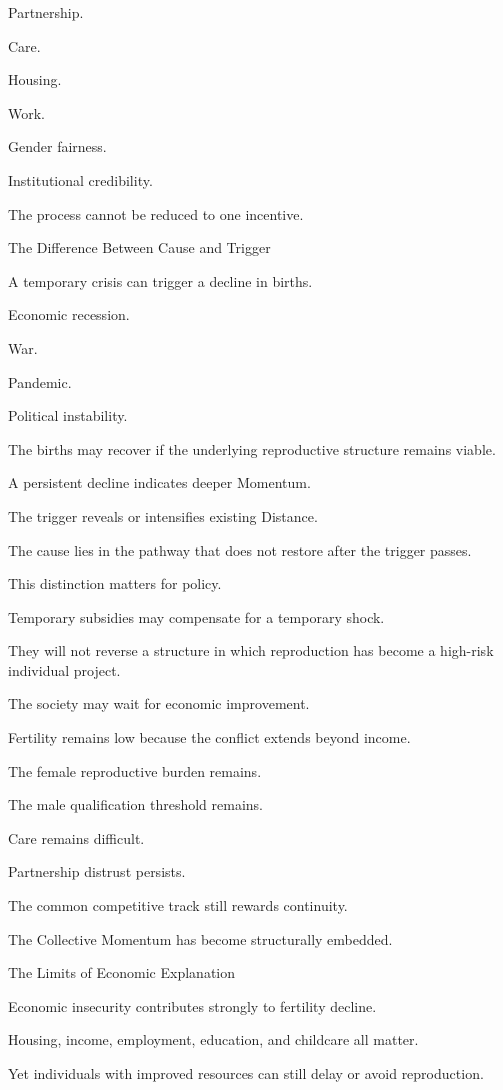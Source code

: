 Partnership.

Care.

Housing.

Work.

Gender fairness.

Institutional credibility.

The process cannot be reduced to one incentive.

The Difference Between Cause and Trigger

A temporary crisis can trigger a decline in births.

Economic recession.

War.

Pandemic.

Political instability.

The births may recover if the underlying reproductive structure remains viable.

A persistent decline indicates deeper Momentum.

The trigger reveals or intensifies existing Distance.

The cause lies in the pathway that does not restore after the trigger passes.

This distinction matters for policy.

Temporary subsidies may compensate for a temporary shock.

They will not reverse a structure in which reproduction has become a high-risk individual project.

The society may wait for economic improvement.

Fertility remains low because the conflict extends beyond income.

The female reproductive burden remains.

The male qualification threshold remains.

Care remains difficult.

Partnership distrust persists.

The common competitive track still rewards continuity.

The Collective Momentum has become structurally embedded.

The Limits of Economic Explanation

Economic insecurity contributes strongly to fertility decline.

Housing, income, employment, education, and childcare all matter.

Yet individuals with improved resources can still delay or avoid reproduction.


